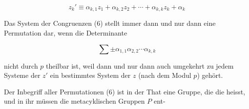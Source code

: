 \[
z_k' \equiv \alpha_{k,1}z_1 + \alpha_{k,2}z_2 + \cdots + \alpha_{k,k}z_k + \alpha_k
\]

Das System der Congruenzen (6) stellt immer dann und nur dann eine Permutation dar, wenn die Determinante

\[
\sum \pm \alpha_{1,1}\alpha_{2,2}\cdots\alpha_{k,k}
\]

nicht durch $p$ theilbar ist, weil dann und nur dann auch umgekehrt zu jedem Systeme der $z'$ ein bestimmtes System der $z$ (nach dem Modul $p$) gehört.

Der Inbegriff aller Permutationen (6) ist in der That eine Gruppe, die die  heisst, und in ihr müssen die metacyklischen Gruppen $P$ ent-

